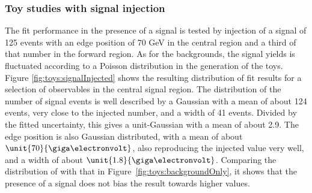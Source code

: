 \subsubsection{Toy studies with signal injection}
\label{sec:toysW}
The fit performance in the presence of a signal is tested by injection of a signal of 125 events with an edge position of 70 GeV in the central region and a third of that number in the forward region. As for the backgrounds, the signal yields is fluctuated according to a Poisson distribution in the generation of the toys. Figure \ref{fig:toys:signalInjected} shows the resulting distribution of fit results for a selection of observables in the central signal region. The distribution of the number of signal events is well described by a Gaussian with a mean of about 124 events, very close to the injected number, and a width of 41 events. Divided by the fitted uncertainty, this gives a unit-Gaussian with a mean of about 2.9. The edge position is also Gaussian distributed, with a mean of about $\unit{70}{\giga\electronvolt}$, also reproducing the injected value very well, and a width of about $\unit{1.8}{\giga\electronvolt}$. Comparing the distribution of \Rsfof with that in Figure~\ref{fig:toys:backgroundOnly}, it shows that the presence of a signal does not bias the result towards higher values. 

